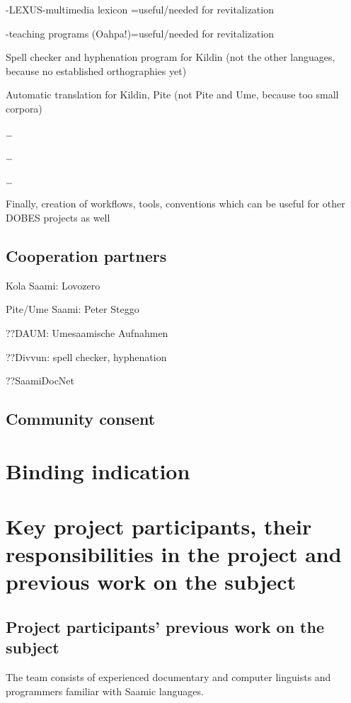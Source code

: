 \documentclass[a4paper,12pt]{article}
\begin{document}
-LEXUS-multimedia lexicon =useful/needed for revitalization

-teaching programs (Oahpa!)=useful/needed for revitalization

Spell checker and hyphenation program for Kildin (not the other languages, because no established orthographies yet)

Automatic translation for Kildin, Pite (not Pite and Ume, because too small corpora)

…

…

…

Finally, creation of workflows, tools, conventions which can be useful for other DOBES projects as well


\subsection{Cooperation partners}
Kola Saami: Lovozero

Pite/Ume Saami: Peter Steggo

??DAUM: Umesaamische Aufnahmen

??Divvun: spell checker, hyphenation

??SaamiDocNet




\subsection{Community consent}

\section{Binding indication}

\section{Key project participants, their responsibilities in the project and previous work on the subject}

\subsection{Project participants' previous work on the subject}
The team consists of experienced documentary and computer linguists and programmers familiar with Saamic languages.
\end{document}
